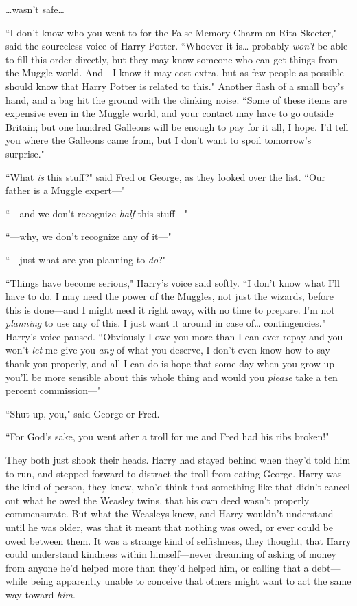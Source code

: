 {\ldots}wasn't safe{\ldots}

``I don't know who you went to for the False Memory Charm on Rita Skeeter," said the sourceless voice of Harry Potter. ``Whoever it is{\ldots} probably \emph{won't} be able to fill this order directly, but they may know someone who can get things from the Muggle world. And—I know it may cost extra, but as few people as possible should know that Harry Potter is related to this." Another flash of a small boy's hand, and a bag hit the ground with the clinking noise. ``Some of these items are expensive even in the Muggle world, and your contact may have to go outside Britain; but one hundred Galleons will be enough to pay for it all, I hope. I'd tell you where the Galleons came from, but I don't want to spoil tomorrow's surprise."

``What \emph{is} this stuff?" said Fred or George, as they looked over the list. ``Our father is a Muggle expert—"

``—and we don't recognize \emph{half} this stuff—"

``—why, we don't recognize any of it—"

``—just what are you planning to \emph{do}?"

``Things have become serious," Harry's voice said softly. ``I don't know what I'll have to do. I may need the power of the Muggles, not just the wizards, before this is done—and I might need it right away, with no time to prepare. I'm not \emph{planning} to use any of this. I just want it around in case of{\ldots} contingencies." Harry's voice paused. ``Obviously I owe you more than I can ever repay and you won't \emph{let} me give you \emph{any} of what you deserve, I don't even know how to say thank you properly, and all I can do is hope that some day when you grow up you'll be more sensible about this whole thing and would you \emph{please} take a ten percent commission—"

``Shut up, you," said George or Fred.

``For God's sake, you went after a troll for me and Fred had his ribs broken!"

They both just shook their heads. Harry had stayed behind when they'd told him to run, and stepped forward to distract the troll from eating George. Harry was the kind of person, they knew, who'd think that something like that didn't cancel out what he owed the Weasley twins, that his own deed wasn't properly commensurate. But what the Weasleys knew, and Harry wouldn't understand until he was older, was that it meant that nothing was owed, or ever could be owed between them. It was a strange kind of selfishness, they thought, that Harry could understand kindness within himself—never dreaming of asking of money from anyone he'd helped more than they'd helped him, or calling that a debt—while being apparently unable to conceive that others might want to act the same way toward \emph{him}.

